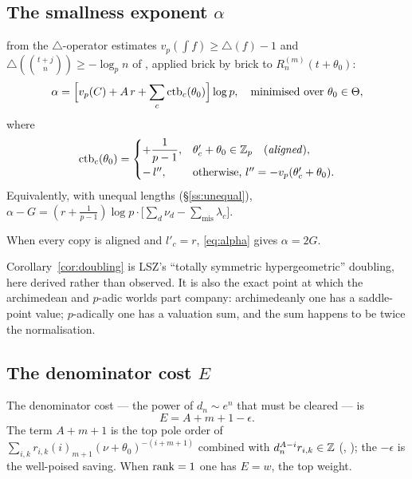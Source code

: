 \subsection{The smallness exponent \texorpdfstring{$\alpha$}{alpha}}\label{ss:alpha}

\begin{proposition}\label{prop:alpha}
\DERIVED{} from the $\triangle$-operator estimates $v_p(\int f)\ge\triangle(f)-1$ and
$\triangle(\binom{t+j}n)\ge-\log_pn$ of \cite[Lemmas 6--7]{LSZ2025}, applied brick by brick
to $R_n^{(m)}(t+\theta_0)$:
\begin{equation}\label{eq:alpha}
 \alpha=\Bigl[v_p(C)+A\,r+\sum_c\operatorname{ctb}_c(\theta_0)\Bigr]\log p,\quad\text{minimised over }
 \theta_0\in\Theta,
\end{equation}
where
\begin{equation}\label{eq:contrib}
 \operatorname{ctb}_c(\theta_0)=
 \begin{cases}
   +\dfrac1{p-1}, & \theta'_c+\theta_0\in\mathbb{Z}_p \quad\text{(\emph{aligned})},\\[2mm]
   -\,l'', & \text{otherwise, } l''=-v_p(\theta'_c+\theta_0).
 \end{cases}
\end{equation}
Equivalently, with unequal lengths (\S\ref{ss:unequal}),
$\alpha-G=(r+\tfrac1{p-1})\log p\cdot\bigl[\sum_d\nu_d-\sum_{\mathrm{mis}}\lambda_c\bigr]$.
\end{proposition}

\begin{corollary}\label{cor:doubling}
\DERIVED{} When every copy is aligned and $l'_c=r$, \eqref{eq:alpha} gives $\alpha=2G$.
\end{corollary}

Corollary~\ref{cor:doubling} is LSZ's ``totally symmetric hypergeometric'' doubling, here
derived rather than observed. It is also the exact point at which the archimedean and
$p$-adic worlds part company: archimedeanly one has a saddle-point value; $p$-adically one
has a valuation sum, and the sum happens to be twice the normalisation.

\subsection{The denominator cost \texorpdfstring{$E$}{E}}\label{ss:E}

\begin{proposition}\label{prop:E}
\DERIVED{} The denominator cost --- the power of $d_n\sim e^n$ that must be cleared --- is
\begin{equation}\label{eq:E}
 E=A+m+1-\epsilon .
\end{equation}
The term $A+m+1$ is the top pole order of
$\sum_{i,k}r_{i,k}(i)_{m+1}(\nu+\theta_0)^{-(i+m+1)}$ combined with
$d_n^{A-i}r_{i,k}\in\mathbb{Z}$ (\cite[Lemma 16]{Zudilin2004},
\cite[Lemmas 26--29]{LaiSprang2023}); the $-\epsilon$ is the well-poised saving. When
$\operatorname{rank}=1$ one has $E=w$, the top weight.
\end{proposition}

